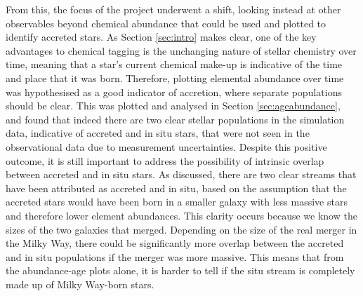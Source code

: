 \documentclass[fleqn,usenatbib]{mnras}
\begin{document}
From this, the focus of the project underwent a shift, looking instead at other observables beyond chemical abundance that could be used and plotted to identify accreted stars. As Section \ref{sec:intro} makes clear, one of the key advantages to chemical tagging is the unchanging nature of stellar chemistry over time, meaning that a star's current chemical make-up is indicative of the time and place that it was born. Therefore, plotting elemental abundance over time was hypothesised as a good indicator of accretion, where separate populations should be clear. This was plotted and analysed in Section \ref{sec:ageabundance}, and found that indeed there are two clear stellar populations in the simulation data, indicative of accreted and in situ stars, that were not seen in the observational data due to measurement uncertainties.  
Despite this positive outcome, it is still important to address the possibility of intrinsic overlap between accreted and in situ stars. As discussed, there are two clear streams that have been attributed as accreted and in situ, based on the assumption that the accreted stars would have been born in a smaller galaxy with less massive stars and therefore lower element abundances. This clarity occurs because we know the sizes of the two galaxies that merged. Depending on the size of the real merger in the Milky Way, there could be significantly more overlap between the accreted and in situ populations if the merger was more massive. This means that from the abundance-age plots alone, it is harder to tell if the situ stream is completely made up of Milky Way-born stars. 
\end{document}
